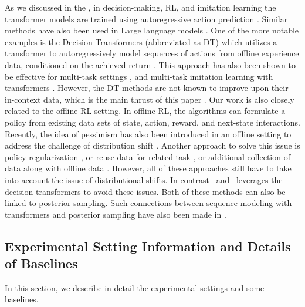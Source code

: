 \documentclass[10pt]{article}
\theoremstyle{plain}
\theoremstyle{definition}
\theoremstyle{remark}
\begin{document}
As we discussed in the , in decision-making, RL, and imitation learning the transformer models are trained using autoregressive action prediction \citep{yang2023bayesian}. Similar methods have also been used in Large language models \citep{vaswani2017attention, roberts2019exploring}. One of the more notable examples is the Decision Transformers (abbreviated as DT) which utilizes a transformer to autoregressively model sequences of actions from offline experience data, conditioned on the achieved return \citep{chen2021decision, janner2021offline}. This approach has also been shown to be effective for multi-task settings \citep{lee2022multi}, and multi-task imitation learning with transformers \citep{reed2022generalist, brohan2022rt, shafiullah2022behavior}. However, the DT methods are not known to improve upon their in-context data, which is the main thrust of this paper \citep{brandfonbrener2022does, yang2022dichotomy}.
Our work is also closely related to the offline RL setting. In offline RL, the algorithms can formulate a policy from existing data sets of state, action, reward, and next-state interactions.
Recently, the idea of pessimism has also been introduced in an offline setting to address the challenge of distribution shift \citep{kumar2020conservative, yu2021combo, liu2020provably, ghasemipour2022so}. Another approach to solve this issue is policy regularization \citep{fujimoto2019off, kumar2019stabilizing, wu2019behavior, siegel2020keep, liu2019off}, or reuse data for related task \citep{li2020focal, mitchell2021offline}, or additional collection of data along with offline data \citep{pong2022offline}. However, all of these approaches still have to take into account the issue of distributional shifts. In contrast \pred\ and \dptg\ leverages the decision transformers to avoid these issues.
Both of these methods can also be linked to posterior sampling. Such connections between sequence modeling with transformers and posterior sampling have also been made in \citet{chen2021decision,muller2021transformers,lee2023supervised, yang2023bayesian}.
\subsection{Experimental Setting Information and Details of Baselines}
\label{sec:addl-expt}
In this section, we describe in detail the experimental settings and some baselines.
\end{document}

